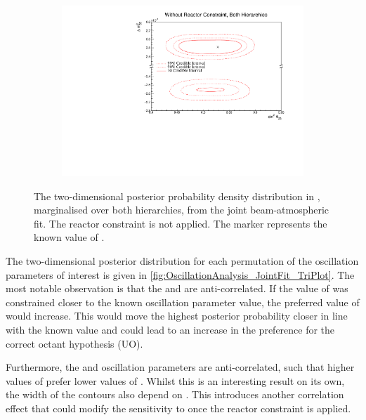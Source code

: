 \begin{figure}[h]
  \begin{subfigure}[t]{0.95\textwidth}
    \includegraphics[width=\textwidth, trim={0mm 0mm 0mm 0mm}, clip,page=1]{Figures/OA/JointFit/Contours_2D_th23_dm32_BH_0_woRC_UnSmeared_CredibleInterval.pdf}
  \end{subfigure}
  \caption{The two-dimensional posterior probability density distribution in , marginalised over both hierarchies, from the joint beam-atmospheric fit. The reactor constraint is not applied. The marker represents the known value of .}
  \label{fig:OscillationAnalysis_JointFit_DM32TH23}
\end{figure}


The two-dimensional posterior distribution for each permutation of the oscillation parameters of interest is given in \autoref{fig:OscillationAnalysis_JointFit_TriPlot}. The most notable observation is that the  and  are anti-correlated. If the value of  was constrained closer to the known oscillation parameter value, the preferred value of  would increase. This would move the highest posterior probability closer in line with the known value and could lead to an increase in the preference for the correct octant hypothesis (UO).

Furthermore, the  and  oscillation parameters are anti-correlated, such that higher values of  prefer lower values of . Whilst this is an interesting result on its own, the width of the  contours also depend on . This introduces another correlation effect that could modify the sensitivity to  once the reactor constraint is applied.

